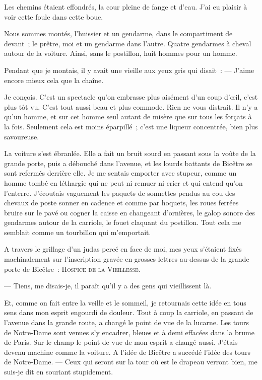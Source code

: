 \documentclass[french,twoside]{book} %
\begin{document}
Les chemins étaient effondrés, la cour pleine de  fange et d’eau. J’ai eu plaisir à voir cette foule dans cette boue.\par
Nous sommes montés, l’huissier et un gendarme, dans le compartiment de devant ; le prêtre, moi et un gendarme dans l’autre. Quatre gendarmes à cheval autour de la voiture. Ainsi, sans le postillon, huit hommes pour un homme.\par
Pendant que je montais, il y avait une vieille aux yeux gris qui disait : — J’aime encore mieux cela que la chaîne.\par
Je conçois. C’est un spectacle qu’on embrasse plus aisément d’un coup d’œil, c’est plus tôt vu. C’est tout aussi beau et plus commode. Rien ne vous distrait. Il n’y a qu’un homme, et sur cet homme seul autant de misère que sur tous les forçats à la fois. Seulement cela est moins éparpillé ; c’est une liqueur concentrée, bien plus savoureuse.\par
La voiture s’est ébranlée. Elle a fait un bruit sourd en passant sous la voûte de la grande porte, puis a débouché dans l’avenue, et les lourds battants de Bicêtre se sont refermés derrière elle. Je me sentais emporter avec stupeur, comme un homme tombé en léthargie qui ne peut ni remuer ni crier et qui entend qu’on l’enterre. J’écoutais vaguement les paquets de sonnettes pendus au cou des chevaux de poste sonner en cadence et comme par hoquets, les roues ferrées bruire sur le pavé ou cogner la caisse en changeant d’ornières, le galop sonore des gendarmes autour de la carriole, le fouet claquant du postillon. Tout cela me semblait comme un tourbillon qui m’emportait.\par
 A travers le grillage d’un judas percé en face de moi, mes yeux s’étaient fixés machinalement sur l’inscription gravée en grosses lettres au-dessus de la grande porte de Bicêtre : H{\scshape ospice de la} V{\scshape ieillesse}.\par
— Tiens, me disais-je, il paraît qu’il y a des gens qui vieillissent là.\par
Et, comme on fait entre la veille et le sommeil, je retournais cette idée en tous sens dans mon esprit engourdi de douleur. Tout à coup la carriole, en passant de l’avenue dans la grande route, a changé le point de vue de la lucarne. Les tours de Notre-Dame sont venues s’y encadrer, bleues et à demi effacées dans la brume de Paris. Sur-le-champ le point de vue de mon esprit a changé aussi. J’étais devenu machine comme la voiture. A l’idée de Bicêtre a succédé l’idée des tours de Notre-Dame. — Ceux qui seront sur la tour où est le drapeau verront bien, me suis-je dit en souriant stupidement.\par
\end{document}
